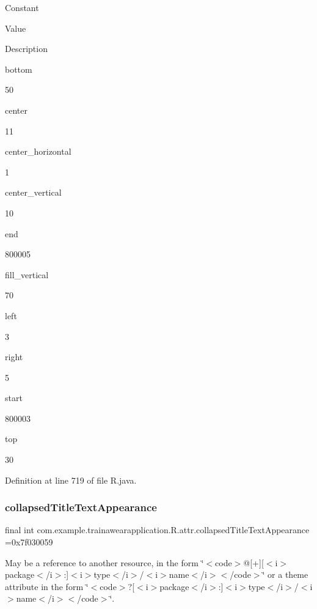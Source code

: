 Constant

Value

Description 

bottom

50

center

11

center\+\_\+horizontal

1

center\+\_\+vertical

10

end

800005

fill\+\_\+vertical

70

left

3

right

5

start

800003

top

30

Definition at line 719 of file R.\+java.

\mbox{\label{classcom_1_1example_1_1trainawearapplication_1_1_r_1_1attr_a1a99799dc23a80dfc583751120ae2b4a}} 
\subsubsection{\texorpdfstring{collapsedTitleTextAppearance}{collapsedTitleTextAppearance}}
{\footnotesize\ttfamily final int com.\+example.\+trainawearapplication.\+R.\+attr.\+collapsed\+Title\+Text\+Appearance =0x7f030059\hspace{0.3cm}{\ttfamily [static]}}

May be a reference to another resource, in the form \char`\"{}$<$code$>$@\mbox{[}+\mbox{]}\mbox{[}$<$i$>$package$<$/i$>$\+:\mbox{]}$<$i$>$type$<$/i$>$/$<$i$>$name$<$/i$>$$<$/code$>$\char`\"{} or a theme attribute in the form \char`\"{}$<$code$>$?\mbox{[}$<$i$>$package$<$/i$>$\+:\mbox{]}$<$i$>$type$<$/i$>$/$<$i$>$name$<$/i$>$$<$/code$>$\char`\"{}. 

